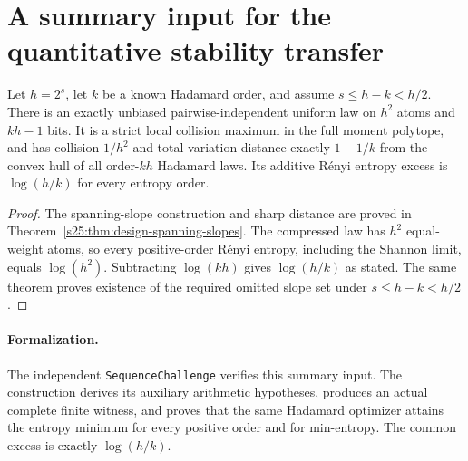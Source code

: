\section{A summary input for the quantitative stability transfer}
\begin{theorem}
Let $h=2^s$, let $k$ be a known Hadamard order, and assume
$s\le h-k<h/2$. There is an exactly unbiased pairwise-independent
uniform law on $h^2$ atoms and $kh-1$ bits. It is a strict local
collision maximum in the full moment polytope, and has collision
$1/h^2$ and total variation distance exactly $1-1/k$ from the convex
hull of all order-$kh$ Hadamard laws. Its additive R\'enyi entropy
excess is $\log(h/k)$ for every entropy order.
\end{theorem}
\begin{proof}
The spanning-slope construction and sharp distance are proved in
Theorem~\ref{s25:thm:design-spanning-slopes}. The compressed law has
$h^2$ equal-weight atoms, so every positive-order R\'enyi entropy,
including the Shannon limit, equals $\log(h^2)$. Subtracting
$\log(kh)$ gives $\log(h/k)$ as stated. The same theorem proves
existence of the required omitted slope set under $s\le h-k<h/2$.
\end{proof}

\paragraph{Formalization.}
The independent \texttt{SequenceChallenge} verifies this summary input. The construction derives its auxiliary
arithmetic hypotheses, produces an actual complete finite witness,
and proves that the same Hadamard optimizer attains the entropy
minimum for every positive order and for min-entropy. The common
excess is exactly $\log(h/k)$.

